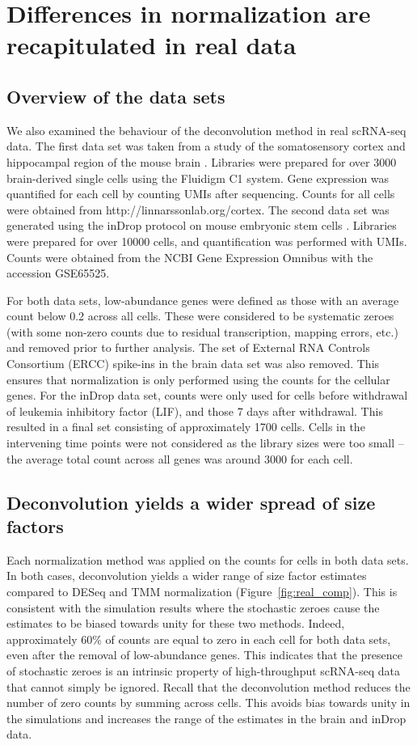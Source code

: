 \documentclass{bmcart}
\begin{document}
\section*{Differences in normalization are recapitulated in real data}

\subsection*{Overview of the data sets}
We also examined the behaviour of the deconvolution method in real scRNA-seq data.
The first data set was taken from a study of the somatosensory cortex and hippocampal region of the mouse brain \cite{zeisel2015brain}.
Libraries were prepared for over 3000 brain-derived single cells using the Fluidigm C1 system.
Gene expression was quantified for each cell by counting UMIs after sequencing.
Counts for all cells were obtained from {http://linnarssonlab.org/cortex}.
The second data set was generated using the inDrop protocol on mouse embryonic stem cells \cite{klein2015droplet}.
Libraries were prepared for over 10000 cells, and quantification was performed with UMIs.
Counts were obtained from the NCBI Gene Expression Omnibus with the accession GSE65525.

For both data sets, low-abundance genes were defined as those with an average count below 0.2 across all cells.
These were considered to be systematic zeroes (with some non-zero counts due to residual transcription, mapping errors, etc.) and removed prior to further analysis.
The set of External RNA Controls Consortium (ERCC) spike-ins in the brain data set was also removed.
This ensures that normalization is only performed using the counts for the cellular genes.
For the inDrop data set, counts were only used for cells before withdrawal of leukemia inhibitory factor (LIF), and those 7 days after withdrawal.
This resulted in a final set consisting of approximately 1700 cells.
Cells in the intervening time points were not considered as the library sizes were too small -- the average total count across all genes was around 3000 for each cell.

\subsection*{Deconvolution yields a wider spread of size factors}
Each normalization method was applied on the counts for cells in both data sets.
In both cases, deconvolution yields a wider range of size factor estimates compared to DESeq and TMM normalization (Figure~\ref{fig:real_comp}).
This is consistent with the simulation results where the stochastic zeroes cause the estimates to be biased towards unity for these two methods.
Indeed, approximately 60\% of counts are equal to zero in each cell for both data sets, even after the removal of low-abundance genes.
This indicates that the presence of stochastic zeroes is an intrinsic property of high-throughput scRNA-seq data that cannot simply be ignored.
Recall that the deconvolution method reduces the number of zero counts by summing across cells.
This avoids bias towards unity in the simulations and increases the range of the estimates in the brain and inDrop data.
\end{document}
